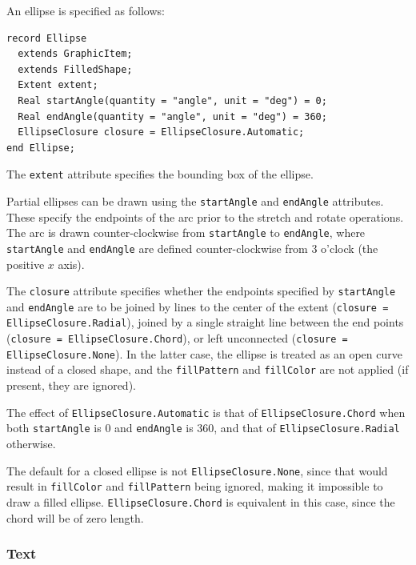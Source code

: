 An ellipse is specified as follows:
\begin{lstlisting}[language=modelica]
record Ellipse
  extends GraphicItem;
  extends FilledShape;
  Extent extent;
  Real startAngle(quantity = "angle", unit = "deg") = 0;
  Real endAngle(quantity = "angle", unit = "deg") = 360;
  EllipseClosure closure = EllipseClosure.Automatic;
end Ellipse;
\end{lstlisting}%
The \lstinline!extent! attribute specifies the bounding box of the ellipse.

Partial ellipses can be drawn using the \lstinline!startAngle! and \lstinline!endAngle! attributes.
These specify the endpoints of the arc prior to the stretch and rotate operations.
The arc is drawn counter-clockwise from \lstinline!startAngle! to \lstinline!endAngle!, where \lstinline!startAngle! and \lstinline!endAngle! are defined counter-clockwise from 3 o'clock (the positive $x$ axis).

The \lstinline!closure! attribute specifies whether the endpoints specified by \lstinline!startAngle! and \lstinline!endAngle! are to be joined by lines to the center of the extent (\lstinline!closure = EllipseClosure.Radial!), joined by a single straight line between the end points (\lstinline!closure = EllipseClosure.Chord!), or left unconnected (\lstinline!closure = EllipseClosure.None!).
In the latter case, the ellipse is treated as an open curve instead of a closed shape, and the \lstinline!fillPattern! and \lstinline!fillColor! are not applied (if present, they are ignored).

The effect of \lstinline!EllipseClosure.Automatic! is that of \lstinline!EllipseClosure.Chord! when both \lstinline!startAngle! is 0 and \lstinline!endAngle! is 360, and that of \lstinline!EllipseClosure.Radial! otherwise.

\begin{nonnormative}
The default for a closed ellipse is not \lstinline!EllipseClosure.None!, since that would result in \lstinline!fillColor! and \lstinline!fillPattern! being ignored, making it impossible to draw a filled ellipse.
\lstinline!EllipseClosure.Chord! is equivalent in this case, since the chord will be of zero length.
\end{nonnormative}

\subsubsection{Text}\label{text}

